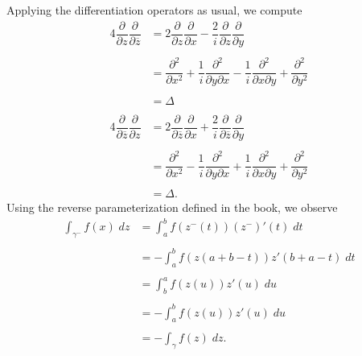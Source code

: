 \documentclass[12pt]{article}
\newenvironment{statement}[1]{\smallskip\noindent\color{black}{\bf #1.}}{}
\theoremstyle{definition}
\theoremstyle{remark}
\newcommand{\p}{\partial}
\begin{document}
\\\\
\begin{statement}{1.10}
Applying the differentiation operators as usual, we compute
\begin{align*}
4\dfrac{\p}{\p z}\dfrac{\p}{\p\overline{z}} &= 2\dfrac{\p}{\p z}\dfrac{\p}{\p x} - \dfrac{2}{i}\dfrac{\p}{\p z}\dfrac{\p}{\p y} \\\\
&= \dfrac{\p^{2}}{\p x^{2}} + \dfrac{1}{i}\dfrac{\p^{2}}{\p y\p x} - \dfrac{1}{i}\dfrac{\p^{2}}{\p x\p y} + \dfrac{\p^{2}}{\p y^{2}} \\\\
&= \Delta \\\\
4\dfrac{\p}{\p \overline{z}}\dfrac{\p}{\p z} &= 2\dfrac{\p}{\p \overline{z}}\dfrac{\p}{\p x} + \dfrac{2}{i}\dfrac{\p}{\p \overline{z}}\dfrac{\p}{\p y} \\\\
&= \dfrac{\p^{2}}{\p x^{2}} - \dfrac{1}{i}\dfrac{\p^{2}}{\p y\p x} + \dfrac{1}{i}\dfrac{\p^{2}}{\p x\p y} + \dfrac{\p^{2}}{\p y^{2}} \\\\
&= \Delta.
\end{align*}
\end{statement}
\begin{statement}{1.24}
Using the reverse parameterization defined in the book, we observe
\begin{align*}
\int_{\gamma^{-}}f(x)\;dz &= \int_{a}^{b}f(z^{-}(t))(z^{-})'(t)\;dt \\\\
&= -\int_{a}^{b}f(z(a + b - t))z'(b + a - t)\;dt \\\\
&= \int_{b}^{a}f(z(u))z'(u)\;du \\\\
&= -\int_{a}^{b}f(z(u))z'(u)\;du \\\\
&= -\int_{\gamma}f(z)\;dz.
\end{align*}
\end{statement}
\end{document}
